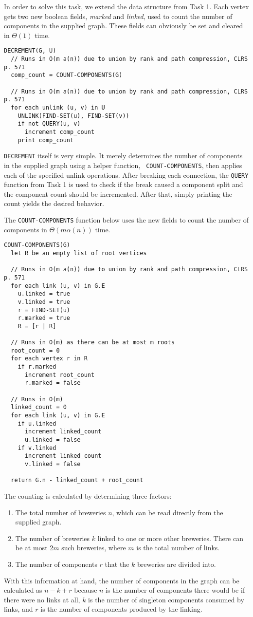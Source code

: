 \documentclass[paper=a4, fleqn]{article}
\begin{document}
In order to solve this task, we extend the data structure from Task 1. Each
vertex gets two new boolean fields, {\em marked} and {\em linked}, used to count
the number of components in the supplied graph. These fields can obviously be
set and cleared in $\Theta(1)$ time.

\begin{lstlisting}
DECREMENT(G, U)
  // Runs in O(m a(n)) due to union by rank and path compression, CLRS p. 571
  comp_count = COUNT-COMPONENTS(G)

  // Runs in O(m a(n)) due to union by rank and path compression, CLRS p. 571
  for each unlink (u, v) in U
    UNLINK(FIND-SET(u), FIND-SET(v))
    if not QUERY(u, v)
      increment comp_count
    print comp_count
\end{lstlisting}
{\tt DECREMENT} itself is very simple. It merely determines the number of
components in the supplied graph using a helper function, {\tt
  COUNT-COMPONENTS}, then applies each of the specified unlink operations. After
breaking each connection, the {\tt QUERY} function from Task 1 is used to check
if the break caused a component split and the component count should be
incremented. After that, simply printing the count yields the desired behavior.

The {\tt COUNT-COMPONENTS} function below uses the new fields to count the
number of components in $\Theta(m\alpha(n))$ time.
\begin{lstlisting}
COUNT-COMPONENTS(G)
  let R be an empty list of root vertices

  // Runs in O(m a(n)) due to union by rank and path compression, CLRS p. 571
  for each link (u, v) in G.E
    u.linked = true
    v.linked = true
    r = FIND-SET(u)
    r.marked = true
    R = [r | R]

  // Runs in O(m) as there can be at most m roots
  root_count = 0
  for each vertex r in R
    if r.marked
      increment root_count
      r.marked = false

  // Runs in O(m)
  linked_count = 0
  for each link (u, v) in G.E
    if u.linked
      increment linked_count
      u.linked = false
    if v.linked
      increment linked_count
      v.linked = false

  return G.n - linked_count + root_count
\end{lstlisting}
The counting is calculated by determining three factors:
\begin{enumerate}
\item The total number of breweries $n$, which can be read directly from the
  supplied graph.
\item The number of breweries $k$ linked to one or more other breweries. There
  can be at most $2m$ such breweries, where $m$ is the total number of links.
\item The number of components $r$ that the $k$ breweries are divided into.
\end{enumerate}
With this information at hand, the number of components in the graph can be
calculated as $n-k+r$ because $n$ is the number of components there would be if
there were no links at all, $k$ is the number of singleton components consumed
by links, and $r$ is the number of components produced by the linking.
\end{document}
